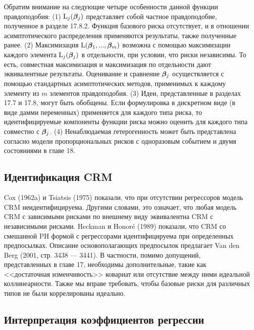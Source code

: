 Обратим внимание на следующие четыре особенности данной функции правдоподобия:
(1) $\mathrm{L}_j(\bm{\beta}_j)$ представляет собой частное правдоподобие, полученное в разделе 17.8.2. %
Функция базового риска отсутствует, и в отношении асимптотического распределения применяются результаты, также полученные ранее.
(2) Максимизация $\mathrm{L}(\bm{\beta}_1, ..., \bm{\beta}_m)$ возможна с помощью максимизации каждого элемента $\mathrm{L}_j(\bm{\beta}_j)$ в отдельности, при условии, что риски независимы. То есть, совместная максимизация и максимизация по отдельности дают эквивалентные результаты.
Оценивание и сравнение $\bm{\beta}_j$ осуществляется с помощью стандартных асимптотических методов, применимых к каждому элементу из $m$ элементов правдоподобия.
(3) Идеи, представленные в разделах
17.7 %
и 17.8, %
могут быть обобщены. Если формулировка в дискретном виде (в виде дамми переменных) применяется для каждого типа риска, то идентифицируемые компоненты функции риска можно оценить для каждого типа совместно с $\bm{\beta}_j$.
(4) Ненаблюдаемая гетерогенность может быть представлена согласно модели пропорциональных рисков с одноразовым событием и двумя состояниями в главе 18. %

\subsection{Идентификация CRM}\label{sec:19.2.3}

\noindent
Cox (1962a) и Tsiatsis (1975) показали, что при отсутствии регрессоров модель CRM неидентифицируема. Другими словами, это означает, что любая модель CRM с зависимыми рисками по внешнему виду %
эквивалентна CRM с независимыми рисками. Heckman и Honor\'e (1989) показали, что CRM со смешанной PH формой с регрессорами идентифицируема  при определенных предпосылках. Описание основополагающих предпосылок предлагает Van den Berg (2001, стр. 3438 --- 3441). В частности, помимо допущений, представленных в главе 17, %
необходимы дополнительные, такие как <<достаточная изменчивость>> ковариат или отсутствие между ними идеальной коллинеарности. Также мы вправе требовать, чтобы базовые риски для различных типов не были коррелированы идеально.


\subsection{Интерпретация коэффициентов регрессии}\label{sec:19.2.4}

